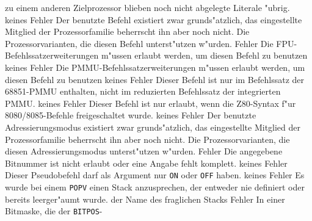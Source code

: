 \documentclass[12pt,a4paper,twoside]{report}
\newcommand{\tty}[1]{{\tt #1}}
\begin{document}
\begin{description}
{                zu einem anderen Zielprozessor blieben noch nicht
                abgelegte Literale "ubrig.}
               {keines}
               {Fehler}
               {Der benutzte Befehl existiert zwar
                grunds"atzlich, das eingestellte Mitglied der
                Prozessorfamilie beherrscht ihn aber noch nicht.}
               {Die Prozessorvarianten, die diesen Befehl
                unterst"utzen w"urden.}
               {Fehler}
               {Die FPU-Befehlssatzerweiterungen m"ussen erlaubt
                werden, um diesen Befehl zu benutzen}
               {keines}
               {Fehler}
               {Die PMMU-Befehlssatzerweiterungen m"ussen erlaubt
                werden, um diesen Befehl zu benutzen}
               {keines}
               {Fehler}
               {Dieser Befehl ist nur im Befehlssatz der 
                68851-PMMU enthalten, nicht im reduzierten
                Befehlssatz der integrierten PMMU.}
               {keines}
               {Fehler}
               {Dieser Befehl ist nur erlaubt, wenn die
                Z80-Syntax f"ur 8080/8085-Befehle freigeschaltet
                wurde.}
               {keines}
               {Fehler}
               {Der benutzte Adressierungsmodus existiert
                zwar grunds"atzlich, das eingestellte Mitglied der
                Prozessorfamilie beherrscht ihn aber noch nicht.}
               {Die Prozessorvarianten, die diesen
                Adressierungsmodus unterst"utzen w"urden.}
               {Fehler}
               {Die angegebene Bitnummer ist nicht erlaubt
	        oder eine Angabe fehlt komplett.}
               {keines}
               {Fehler}
               {Dieser Pseudobefehl darf als Argument nur \tty{ON}
                oder \tty{OFF} haben.}
               {keines}
               {Fehler}
               {Es wurde bei einem \tty{POPV}
                einen Stack anzusprechen, der entweder nie definiert oder
                bereits leerger"aumt wurde.}
               {der Name des fraglichen Stacks}
	       {Fehler}
               {In einer Bitmaske, die der \tty{BITPOS}-
}
\end{description}
\end{document}
